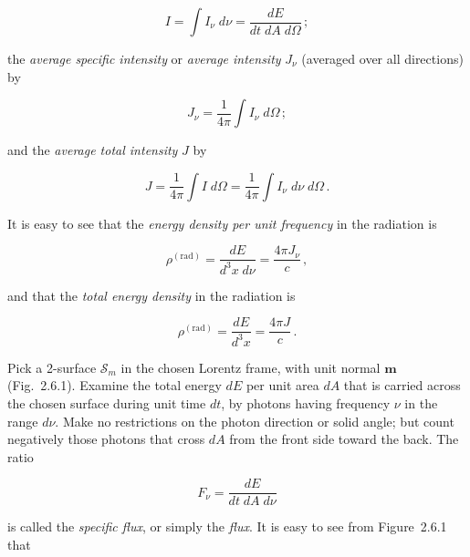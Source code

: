 \documentclass[aps,prd,twocolumn,superscriptaddress,nofootinbib]{revtex4-2}
\newcommand{\fvec}[1]{\mathbf{#1}}
\begin{document}
\begin{equation}
I = \int I_\nu\;d\nu = \frac{dE}{dt\;dA\;d\Omega}\,;
\tag{2.6.2}
\end{equation}

the \textit{average specific intensity} or \textit{average intensity} $J_\nu$ (averaged over all directions)
by

\begin{equation}
J_\nu = \frac{1}{4\pi}\int I_\nu\;d\Omega\,;
\tag{2.6.3}
\end{equation}

and the \textit{average total intensity} $J$ by

\begin{equation}
J = \frac{1}{4\pi}\int I\;d\Omega = \frac{1}{4\pi}\int I_\nu\;d\nu\;d\Omega\,.
\tag{2.6.4}
\end{equation}

It is easy to see that the \textit{energy density per unit frequency} in the radiation is

\begin{equation}
\rho^{(\text{rad})} = \frac{dE}{d^3x\;d\nu} = \frac{4\pi J_\nu}{c}\,,
\tag{2.6.5}
\end{equation}

and that the \textit{total energy density} in the radiation is

\begin{equation}
\rho^{(\text{rad})} = \frac{dE}{d^3x} = \frac{4\pi J}{c}\,.
\tag{2.6.6}
\end{equation}


Pick a 2-surface $\mathscr{S}_m$ in the chosen Lorentz frame, with unit normal $\fvec{m}$ (Fig.\
2.6.1).  Examine the total energy $dE$ per unit area $dA$ that is carried across the
chosen surface during unit time $dt$, by photons having frequency $\nu$ in the range
$d\nu$.  Make no restrictions on the photon direction or solid angle; but count
negatively those photons that cross $dA$ from the front side toward the back.
The ratio

\begin{equation}
F_\nu = \frac{dE}{dt\;dA\;d\nu}
\tag{2.6.7}
\end{equation}

is called the \textit{specific flux}, or simply the \textit{flux}.  It is easy to see from Figure~2.6.1
that
\end{document}
